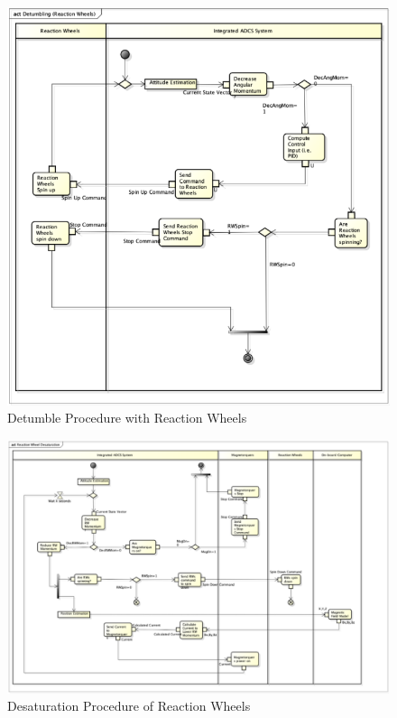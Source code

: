 \documentclass[conf]{new-aiaa}
\begin{document}
\begin{figure}[H]
\centering
\includegraphics[width=1.0\textwidth]{Figures/AC_DT_RW_AD.png}
\caption{Detumble Procedure with Reaction Wheels}
\label{fig:AC_DetumRW_AD}
\end{figure}

\begin{figure}[H]
\centering
\includegraphics[width=1.0\textwidth]{Figures/AC_DS_AD.png}
\caption{Desaturation Procedure of Reaction Wheels}
\label{fig:AC_Desat_AD}
\end{figure}
\end{document}
